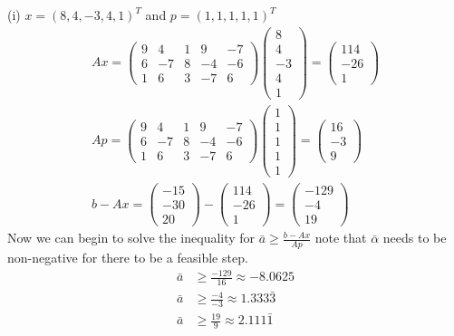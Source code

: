 \documentclass{article}
\begin{document}
\noindent(i) $x =  (8,4,-3,4,1)^T$ and $p = (1,1,1,1,1)^T$ 
\begin{align*}
    Ax = \begin{pmatrix}
        9 & 4 & 1 & 9 & -7 \\
        6 & -7 & 8 & -4 & -6 \\ 
        1 & 6 & 3 & -7 & 6
    \end{pmatrix}
    \begin{pmatrix}
        8 \\ 4 \\ -3 \\ 4 \\ 1
    \end{pmatrix} = \begin{pmatrix}
        114 \\ -26 \\ 1
    \end{pmatrix} \\
    Ap = \begin{pmatrix}
        9 & 4 & 1 & 9 & -7 \\
        6 & -7 & 8 & -4 & -6 \\ 
        1 & 6 & 3 & -7 & 6
    \end{pmatrix}
    \begin{pmatrix}
        1 \\ 1 \\ 1 \\ 1 \\ 1
    \end{pmatrix} = \begin{pmatrix}
        16 \\ -3 \\ 9
    \end{pmatrix} \\
    b - Ax = \begin{pmatrix}
        -15 \\ -30 \\ 20  
    \end{pmatrix} -
    \begin{pmatrix}
        114 \\ -26 \\ 1
    \end{pmatrix} =
    \begin{pmatrix}
        -129 \\ -4 \\ 19
    \end{pmatrix} 
\end{align*}
Now we can begin to solve the inequality for $\bar{a} \geq \frac{b - Ax}{Ap}$ note that $\bar{\alpha}$ needs to be non-negative for there to be a feasible step.
\begin{align}
    \bar{a} &\geq \frac{-129}{16} \approx -8.0625 \\
    \bar{a} & \geq \frac{-4}{-3} \approx 1.333\bar{3} \\
    \bar{a} & \geq \frac{19}{9} \approx 2.111\bar{1}
\end{align}
\end{document}
